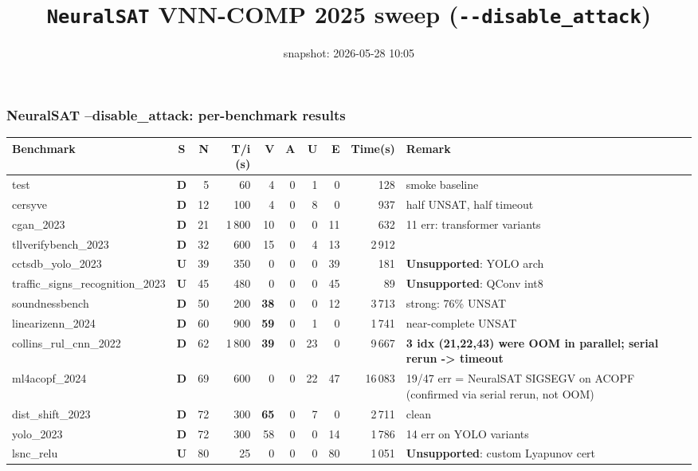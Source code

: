 \documentclass[10pt]{beamer}
\title{\large \texttt{NeuralSAT} VNN-COMP 2025 sweep (\texttt{-{}-disable\_attack})}
\date{snapshot: 2026-05-28 10:05}
\newcommand{\sdone}{{\color{cdone}\textbf{D}}}
\newcommand{\sunsup}{{\color{cunsup}\textbf{U}}}
\begin{document}
\begin{frame}[fragile]
\frametitle{NeuralSAT --disable\_attack: per-benchmark results}

\centering\tiny
\setlength{\tabcolsep}{3pt}
\begin{tabular}{l c r r r r r r r l}
\toprule
\textbf{Benchmark} & \textbf{S} & \textbf{N} & \textbf{T/i (s)} & \textbf{V} & \textbf{A} & \textbf{U} & \textbf{E} & \textbf{Time(s)} & \textbf{Remark} \\
\midrule
test                            & \sdone  & 5    & 60   & 4    & 0   & 1   & 0   & 128     & smoke baseline \\
cersyve                         & \sdone  & 12   & 100  & 4    & 0   & 8   & 0   & 937     & half UNSAT, half timeout \\
cgan\_2023                      & \sdone  & 21   & 1\,800 & 10 & 0   & 0   & 11  & 632     & 11 err: transformer variants \\
tllverifybench\_2023            & \sdone  & 32   & 600  & 15   & 0   & 4   & 13  & 2\,912  & \\
cctsdb\_yolo\_2023              & \sunsup & 39   & 350  & 0    & 0   & 0   & 39  & 181     & \textbf{Unsupported}: YOLO arch \\
traffic\_signs\_recognition\_2023 & \sunsup & 45 & 480  & 0  & 0   & 0   & 45  & 89      & \textbf{Unsupported}: QConv int8 \\
soundnessbench                  & \sdone  & 50   & 200  & \textbf{38} & 0 & 0 & 12 & 3\,713 & strong: 76\% UNSAT \\
linearizenn\_2024               & \sdone  & 60   & 900  & \textbf{59} & 0 & 1 & 0 & 1\,741 & near-complete UNSAT \\
collins\_rul\_cnn\_2022         & \sdone  & 62   & 1\,800 & \textbf{39} & 0 & 23 & 0 & 9\,667 & \textbf{3 idx (21,22,43) were OOM in parallel; serial rerun -> timeout} \\
ml4acopf\_2024                  & \sdone  & 69   & 600  & 0    & 0   & 22  & 47  & 16\,083 & 19/47 err = NeuralSAT SIGSEGV on ACOPF (confirmed via serial rerun, not OOM) \\
dist\_shift\_2023               & \sdone  & 72   & 300  & \textbf{65} & 0 & 7 & 0 & 2\,711 & clean \\
yolo\_2023                      & \sdone  & 72   & 300  & 58   & 0   & 0   & 14  & 1\,786  & 14 err on YOLO variants \\
lsnc\_relu                      & \sunsup & 80   & 25   & 0    & 0   & 0   & 80  & 1\,051  & \textbf{Unsupported}: custom Lyapunov cert \\

\end{tabular}
\end{frame}
\end{document}
